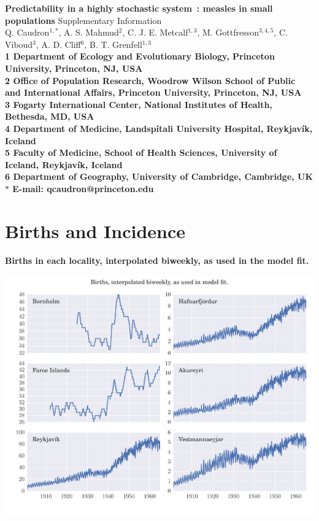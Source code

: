 \documentclass[10pt]{article}
\date{}
\begin{document}
\begin{flushleft}
{\Large
\textbf{Predictability in a highly stochastic system~: measles in small populations} \newline Supplementary Information
}
\\
Q. Caudron$^{1,\ast}$, 
A. S. Mahmud$^{2}$, 
C. J. E. Metcalf$^{1,3}$,
M. Gottfre{\dh}sson$^{3,4,5}$,
C. Viboud$^{3}$,
A. D. Cliff$^{6}$,
B. T. Grenfell$^{1,3}$
\\
\bf{1} Department of Ecology and Evolutionary Biology, Princeton University, Princeton, NJ, USA
\\
\bf{2} Office of Population Research, Woodrow Wilson School of Public and International Affairs, Princeton University, Princeton, NJ, USA
\\
\bf{3} Fogarty International Center, National Institutes of Health, Bethesda, MD, USA
\\
\bf{4} Department of Medicine, Landsp\'{i}tali University Hospital, Reykjav\'{i}k, Iceland
\\
\bf{5} Faculty of Medicine, School of Health Sciences, University of Iceland, Reykjav\'{i}k, Iceland
\\
\bf{6} Department of Geography, University of Cambridge, Cambridge, UK
\\
$\ast$ E-mail: qcaudron@princeton.edu
\end{flushleft}













\section*{Births and Incidence}

\textbf{Births in each locality, interpolated biweekly, as used in the model fit.}

\begin{center}
\includegraphics[width=\textwidth]{supp2.pdf}
\end{center}
\end{document}
